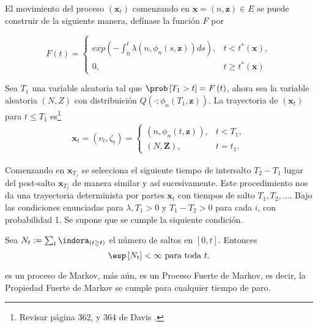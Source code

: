 El movimiento del proceso $\left(\mathbf{x}_{t}\right)$ comenzando
en $\mathbf{x}=\left(n,\mathbf{z}\right)\in E$ se puede construir
de la siguiente manera, def\'inase la funci\'on $F$ por

\begin{equation}
F\left(t\right)=\left\{\begin{array}{ll}\\
exp\left(-\int_{0}^{t}\lambda\left(n,\phi_{n}\left(s,\mathbf{z}\right)\right)ds\right), & t<t^{*}\left(\mathbf{x}\right),\\
0, & t\geq t^{*}\left(\mathbf{x}\right)
\end{array}\right.
\end{equation}

Sea $T_{1}$ una variable aleatoria tal que
$\prob\left[T_{1}>t\right]=F\left(t\right)$, ahora sea la variable
aleatoria $\left(N,Z\right)$ con distribuici\'on
$Q\left(\cdot;\phi_{n}\left(T_{1},\mathbf{z}\right)\right)$. La
trayectoria de $\left(\mathbf{x}_{t}\right)$ para $t\leq T_{1}$
es\footnote{Revisar p\'agina 362, y 364 de Davis \cite{Davis}.}
\begin{eqnarray*}
\mathbf{x}_{t}=\left(v_{t},\zeta_{t}\right)=\left\{\begin{array}{ll}
\left(n,\phi_{n}\left(t,\mathbf{z}\right)\right), & t<T_{1},\\
\left(N,\mathbf{Z}\right), & t=t_{1}.
\end{array}\right.
\end{eqnarray*}

Comenzando en $\mathbf{x}_{T_{1}}$ se selecciona el siguiente
tiempo de intersalto $T_{2}-T_{1}$ lugar del post-salto
$\mathbf{x}_{T_{2}}$ de manera similar y as\'i sucesivamente. Este
procedimiento nos da una trayectoria determinista por partes
$\mathbf{x}_{t}$ con tiempos de salto $T_{1},T_{2},\ldots$. Bajo
las condiciones enunciadas para $\lambda,T_{1}>0$  y
$T_{1}-T_{2}>0$ para cada $i$, con probabilidad 1. Se supone que
se cumple la siquiente condici\'on.

\begin{Sup}\label{Sup3.1.Davis}
Sea $N_{t}:=\sum_{t}\indora_{\left(t\geq t\right)}$ el n\'umero de
saltos en $\left[0,t\right]$. Entonces
\begin{equation}
\esp\left[N_{t}\right]<\infty\textrm{ para toda }t.
\end{equation}
\end{Sup}

es un proceso de Markov, m\'as a\'un, es un Proceso Fuerte de
Markov, es decir, la Propiedad Fuerte de Markov se cumple para
cualquier tiempo de paro.


